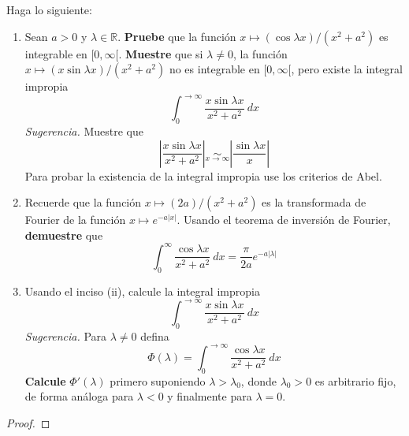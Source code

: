 \documentclass[12pt]{report}
\theoremstyle{largebreak}
\newcommand\abs[1]{\ensuremath{\left|#1\right|}}
\begin{document}
    \begin{excer}
        Haga lo siguiente:
        \begin{enumerate}
            \item Sean $a>0$ y $\lambda\in\mathbb{R}$. \textbf{Pruebe} que la función $x\mapsto (\cos \lambda x)/(x^2+a^2)$ es integrable en $[0,\infty[$. \textbf{Muestre} que si $\lambda\neq0$, la función $x\mapsto (x\sin \lambda x)/(x^2+a^2)$ no es integrable en $[0,\infty[$, pero existe la integral impropia
            \begin{equation*}
                \int_0^{\rightarrow\infty}\frac{x\sin\lambda x}{x^2+a^2}\:dx
            \end{equation*}
            \textit{Sugerencia.} Muestre que
            \begin{equation*}
                \abs{\frac{x\sin\lambda x}{x^2+a^2}}\underset{x\rightarrow\infty}{\sim}\abs{\frac{\sin\lambda x}{x}}
            \end{equation*}
            Para probar la existencia de la integral impropia use los criterios de Abel.
            \item Recuerde que la función $x\mapsto (2a)/(x^2+a^2)$ es la transformada de Fourier de la función $x\mapsto e^{-a\abs{x}}$. Usando el teorema de inversión de Fourier, \textbf{demuestre} que
            \begin{equation*}
                \int_0^{\infty}\frac{\cos\lambda x}{x^2+a^2}\:dx=\frac{\pi}{2a}e^{ -a\abs{\lambda}}
            \end{equation*}
            \item Usando el inciso (ii), calcule la integral impropia
            \begin{equation*}
                \int_0^{\rightarrow\infty}\frac{x\sin\lambda x}{x^2+a^2}\:dx
            \end{equation*}
            \textit{Sugerencia.} Para $\lambda\neq0$ defina
            \begin{equation*}
                \Phi(\lambda)=\int_0^{\rightarrow\infty}\frac{\cos\lambda x}{x^2+a^2}\:dx
            \end{equation*}
            \textbf{Calcule} $\Phi'(\lambda)$ primero suponiendo $\lambda>\lambda_0$, donde $\lambda_0>0$ es arbitrario fijo, de forma análoga para $\lambda<0$ y finalmente para $\lambda=0$.
        \end{enumerate}
    \end{excer}

    \begin{proof}
        
    \end{proof}
\end{document}
